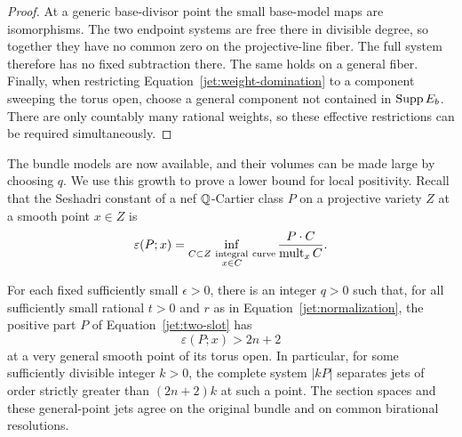 \begin{proof}
At a generic base-divisor point the small base-model maps are
isomorphisms.  The two endpoint systems are free there in divisible
degree, so together they have no common zero on the projective-line
fiber.  The full system therefore has no fixed subtraction there.
The same holds on a general fiber.  Finally, when restricting
Equation~\eqref{jet:weight-domination} to a component sweeping the
torus open, choose a general component not contained in
\(\operatorname{Supp} E_b\).  There are only countably many rational weights, so
these effective restrictions can be required simultaneously.
\end{proof}

The bundle models are now available, and their volumes can be made
large by choosing \(q\).  We use this growth to prove a lower bound
for local positivity.  Recall that the Seshadri constant of a nef
\(\mathbb{Q}\)-Cartier class \(P\) on a projective variety \(Z\) at a smooth
point \(x\in Z\) is
\[
 \varepsilon(P;x)=
 \inf_{\substack{C\subset Z\ \mathrm{integral\ curve}\\x\in C}}
       \frac{P\cdot C}{\operatorname{mult}_x C}.
\]

\begin{proposition}\label{prop:large-seshadri}
For each fixed sufficiently small \(\epsilon>0\), there is an integer
\(q>0\) such that, for all sufficiently small rational \(t>0\) and
\(r\) as in Equation~\eqref{jet:normalization}, the positive part
\(P\) of Equation~\eqref{jet:two-slot} has
\[
 \varepsilon(P;x)>2n+2
\]
at a very general smooth point of its torus open.
In particular, for some sufficiently divisible integer \(k>0\),
the complete system \(|kP|\) separates jets of order strictly
greater than \((2n+2)k\) at such a point.
The section spaces and these general-point jets agree on the
original bundle and on common birational resolutions.
\end{proposition}

